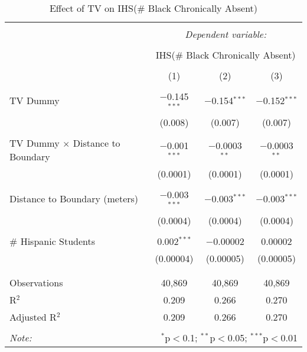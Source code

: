 
\begin{table}[!htbp] \centering 
  \caption{Effect of TV on IHS(\# Black Chronically Absent)} 
  \label{} 
\begin{tabular}{@{\extracolsep{-2pt}}lccc} 
\\[-1.8ex]\hline 
\hline \\[-1.8ex] 
 & \multicolumn{3}{c}{\textit{Dependent variable:}} \\ 
\cline{2-4} 
\\[-1.8ex] & \multicolumn{3}{c}{IHS(\# Black Chronically Absent)} \\ 
\\[-1.8ex] & (1) & (2) & (3)\\ 
\hline \\[-1.8ex] 
 TV Dummy & $-$0.145$^{***}$ & $-$0.154$^{***}$ & $-$0.152$^{***}$ \\ 
  & (0.008) & (0.007) & (0.007) \\ 
  & & & \\ 
 TV Dummy $\times$ Distance to Boundary & $-$0.001$^{***}$ & $-$0.0003$^{**}$ & $-$0.0003$^{**}$ \\ 
  & (0.0001) & (0.0001) & (0.0001) \\ 
  & & & \\ 
 Distance to Boundary (meters) & $-$0.003$^{***}$ & $-$0.003$^{***}$ & $-$0.003$^{***}$ \\ 
  & (0.0004) & (0.0004) & (0.0004) \\ 
  & & & \\ 
 \# Hispanic Students & 0.002$^{***}$ & $-$0.00002 & 0.00002 \\ 
  & (0.00004) & (0.00005) & (0.00005) \\ 
  & & & \\ 
\hline \\[-1.8ex] 
Observations & 40,869 & 40,869 & 40,869 \\ 
R$^{2}$ & 0.209 & 0.266 & 0.270 \\ 
Adjusted R$^{2}$ & 0.209 & 0.266 & 0.270 \\ 
\hline 
\hline \\[-1.8ex] 
\textit{Note:}  & \multicolumn{3}{r}{$^{*}$p$<$0.1; $^{**}$p$<$0.05; $^{***}$p$<$0.01} \\ 
\end{tabular} 
\end{table} 
